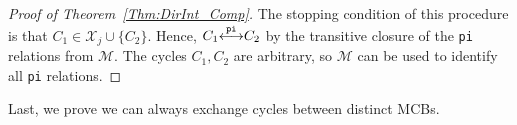 \documentclass[fleqn,11pt]{article}
\newcommand\calM{\mathcal{M}}
\newcommand\calX{\mathcal{X}}     %
\newcommand\pInt{ \stackrel{\tt pi}{\longleftrightarrow} }
\begin{document}
\begin{proof}[Proof of Theorem~\ref{Thm:DirInt_Comp}]
	The stopping condition of this procedure is that $C_1\in\calX_j\cup\{C_2\}$. Hence, $C_1{\pInt} C_2$ by the transitive closure of the {\tt pi} relations from $\calM$. The cycles $C_1,C_2$ are arbitrary, so $\calM$ can be used to identify all {\tt pi} relations.%
\end{proof}

Last, we prove we can always exchange cycles between distinct MCBs.
\end{document}

